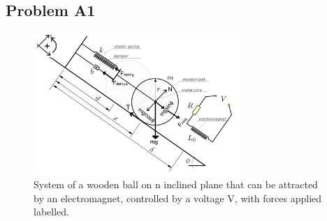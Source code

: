 \subsection*{Problem A1}
\hfill \break
\begin{figure}[h!]
  \includegraphics[width=0.7\textwidth]{Report/figures/main_diagram}
  \caption{System of a wooden ball on n inclined plane that can be attracted by an electromagnet, controlled by a voltage V, with forces applied labelled.}
\end{figure}

